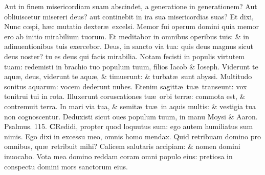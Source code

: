 \documentclass[a5paper,10pt]{book}
\def\ae{æ}
\def\oe{œ}
\begin{document}
\begin{multicols*}{2}
\newline \color{red} A\color{black}ut in finem misericordiam suam abscindet, a generatione in generationem?
\newline \color{red} A\color{black}ut obliuiscetur misereri deus? aut continebit in ira sua misericordias suas?
\newline \color{red} E\color{black}t dixi, Nunc c\oe pi, h\ae c mutatio dexter\ae \ excelsi.
\newline \color{red} M\color{black}emor fui operum domini quia memor ero ab initio mirabilium tuorum.
\newline \color{red} E\color{black}t meditabor in omnibus operibus tuis: \& in adinuentionibus tuis exercebor.
\newline \color{red} D\color{black}eus, in sancto via tua: quis deus magnus sicut deus noster? tu es deus qui facis mirabilia.
\newline \color{red} N\color{black}otam fecisti in populis virtutem tuam: redemisti in brachio tuo populum tuum, filios Iacob \& Ioseph.
\newline \color{red} V\color{black}iderunt te aqu\ae , deus, viderunt te aqu\ae , \& timuerunt: \& turbat\ae \ sunt abyssi.
\newline \color{red} M\color{black}ultitudo sonitus aquarum: vocem dederunt nubes.
\newline \color{red} E\color{black}tenim sagitt\ae \ tu\ae \ transeunt: vox tonitrui tui in rota.
\newline \color{red} I\color{black}lluxerunt coruscationes tu\ae \ orbi terr\ae : commota est, \& contremuit terra.
\newline \color{red} I\color{black}n mari via tua, \& semit\ae \ tu\ae \ in aquis multis: \& vestigia tua non cognoscentur.
\newline \color{red} D\color{black}eduxisti sicut oues populum tuum, in manu Moysi \& Aaron. \color{red} Psalmus. 115. \color{black}
\vspace{-.5em}
\lettrine[lines=2]{\bfseries \color{red} C}{}Redidi, propter quod loquutus sum: ego autem humiliatus sum nimis.
\newline \color{red} E\color{black}go dixi in excessu meo, omnis homo mendax.
\newline \color{red} Q\color{black}uid retribuam domino pro omnibus, qu\ae \ retribuit mihi?
\newline \color{red} C\color{black}alicem salutaris accipiam: \& nomen domini inuocabo.
\newline \color{red} V\color{black}ota mea domino reddam coram omni populo eius: pretiosa in conspectu domini mors sanctorum eius.

\end{multicols*}
\end{document}
